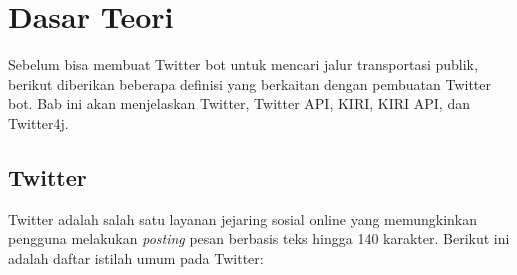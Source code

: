 \chapter{Dasar Teori}
\label{chap:dasar teori}

Sebelum bisa membuat Twitter bot untuk mencari jalur transportasi publik, berikut diberikan beberapa definisi yang berkaitan dengan pembuatan Twitter bot. Bab ini akan menjelaskan Twitter, Twitter API, KIRI, KIRI API, dan Twitter4j.

\section{Twitter}
\label{sec:twitter}

Twitter adalah salah satu layanan jejaring sosial online yang memungkinkan pengguna melakukan \textit{posting} pesan berbasis teks hingga 140 karakter\cite{TwitterBook}. Berikut ini adalah daftar istilah umum pada Twitter:


